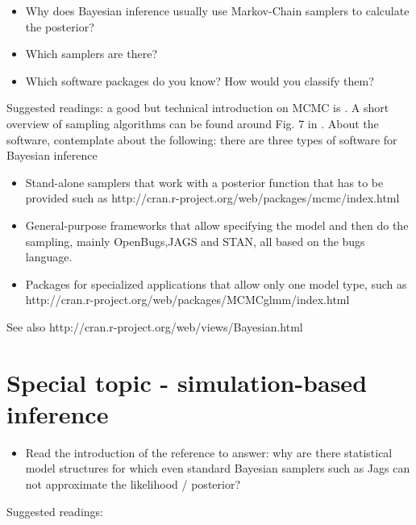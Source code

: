 \documentclass[10pt,a4paper]{article}
\begin{document}
\begin{mdframed}[frametitle={Ask yourself}]
\begin{itemize}
  \item Why does Bayesian inference usually use Markov-Chain samplers to calculate the posterior?
  \item Which samplers are there?
  \item Which software packages do you know? How would you classify them?
\end{itemize}
\end{mdframed}\vspace{0.3cm}

Suggested readings: a good but technical introduction on MCMC is \citet{Andrieu-introductiontoMCMC-2003}. A short overview of sampling algorithms can be found around Fig. 7 in \citet{Hartig-Statisticalinferencestochastic-2011}. About the software, contemplate about the following: there are three types of software for Bayesian inference

\begin{itemize}
\item Stand-alone samplers that work with a posterior function that has to be provided such as http://cran.r-project.org/web/packages/mcmc/index.html
\item General-purpose frameworks that allow specifying the model and then do the sampling, mainly OpenBugs,JAGS and STAN, all based on the bugs language.
\item Packages for specialized applications that allow only one model type, such as http://cran.r-project.org/web/packages/MCMCglmm/index.html 
\end{itemize}

See also http://cran.r-project.org/web/views/Bayesian.html

\section{Special topic - simulation-based inference}

\begin{mdframed}[frametitle={Ask yourself}]
\begin{itemize}
  \item Read the introduction of the reference to answer: why are there statistical model structures for which even standard Bayesian samplers such as Jags can not approximate the likelihood / posterior?
\end{itemize}
\end{mdframed}\vspace{0.3cm}

Suggested readings: \citep{Hartig-Statisticalinferencestochastic-2011}





\end{document}
